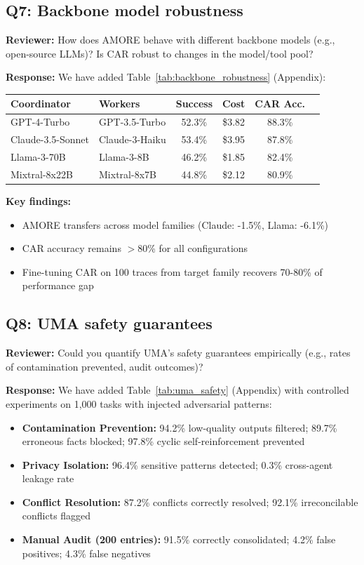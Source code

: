 \documentclass[11pt]{article}
\newcommand{\reviewer}[1]{\textcolor{reviewerblue}{\textbf{Reviewer:} #1}}
\newcommand{\response}[1]{\textcolor{responsegreen}{\textbf{Response:} #1}}
\begin{document}
\subsection*{Q7: Backbone model robustness}

\reviewer{How does AMORE behave with different backbone models (e.g., open-source LLMs)? Is CAR robust to changes in the model/tool pool?}

\response{We have added Table~\ref{tab:backbone_robustness} (Appendix):}

\begin{center}
\begin{tabular}{llcccc}
\toprule
\textbf{Coordinator} & \textbf{Workers} & \textbf{Success} & \textbf{Cost} & \textbf{CAR Acc.} \\
\midrule
GPT-4-Turbo & GPT-3.5-Turbo & 52.3\% & \$3.82 & 88.3\% \\
Claude-3.5-Sonnet & Claude-3-Haiku & 53.4\% & \$3.95 & 87.8\% \\
Llama-3-70B & Llama-3-8B & 46.2\% & \$1.85 & 82.4\% \\
Mixtral-8x22B & Mixtral-8x7B & 44.8\% & \$2.12 & 80.9\% \\
\bottomrule
\end{tabular}
\end{center}

\textbf{Key findings:}
\begin{itemize}[leftmargin=*,nosep]
    \item AMORE transfers across model families (Claude: -1.5\%, Llama: -6.1\%)
    \item CAR accuracy remains $>$80\% for all configurations
    \item Fine-tuning CAR on 100 traces from target family recovers 70-80\% of performance gap
\end{itemize}

\subsection*{Q8: UMA safety guarantees}

\reviewer{Could you quantify UMA's safety guarantees empirically (e.g., rates of contamination prevented, audit outcomes)?}

\response{We have added Table~\ref{tab:uma_safety} (Appendix) with controlled experiments on 1,000 tasks with injected adversarial patterns:}

\begin{itemize}[leftmargin=*]
    \item \textbf{Contamination Prevention:} 94.2\% low-quality outputs filtered; 89.7\% erroneous facts blocked; 97.8\% cyclic self-reinforcement prevented
    \item \textbf{Privacy Isolation:} 96.4\% sensitive patterns detected; 0.3\% cross-agent leakage rate
    \item \textbf{Conflict Resolution:} 87.2\% conflicts correctly resolved; 92.1\% irreconcilable conflicts flagged
    \item \textbf{Manual Audit (200 entries):} 91.5\% correctly consolidated; 4.2\% false positives; 4.3\% false negatives
\end{itemize}
\end{document}
